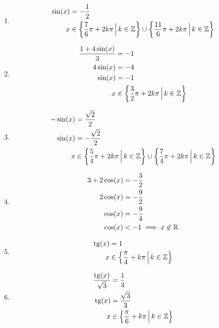 \documentclass[11pt,a4paper]{article}
\begin{document}
\begin{enumerate}
				\item 
				\begin{align*}
					\sin(x) &= - \frac 12
				\\
					x &\in \left\{ \frac 76 \pi + 2k\pi \, \Big| \, k \in {\mathbb Z} \right\} \cup \left\{ \frac{11}6 \pi + 2k\pi \, \Big| \, k \in {\mathbb Z} \right\}
				\end{align*}
				
				\item 
				\begin{align*}
					\frac{1 + 4\sin(x)}{3} &= -1
				\\
					4\sin(x) &= -4
				\\
					\sin(x) &= -1
				\\
					x &\in \left\{ \frac 32 \pi + 2k\pi \, \Big| \, k \in {\mathbb Z} \right\}
				\end{align*}
				
				\item 
				\begin{align*}
					-\sin(x) &= \frac{\sqrt 2}{2}
				\\
					\sin(x) &= -\frac{\sqrt 2}{2}
				\\
					x &\in \left\{ \frac 54 \pi + 2k\pi \, \Big| \, k \in {\mathbb Z} \right\} \cup \left\{ \frac 74 \pi + 2k\pi \, \Big| \, k \in {\mathbb Z} \right\}
				\end{align*}
				
				\item 
				\begin{align*}
					3 + 2\cos(x) &= -\frac 32
				\\
					2\cos(x) &= -\frac 92
				\\
					\cos(x) &= -\frac 94
				\\
					\cos(x) &< -1 \implies x \not\in {\mathbb R}
				\end{align*}
				
				\item 
				\begin{align*}
					\mathrm{tg}(x) &= 1
				\\
					x &\in \left\{ \frac \pi 4 + k\pi \, \Big| \, k \in {\mathbb Z} \right\}
				\end{align*}
				
				\item 
				\begin{align*}
					\frac{\mathrm{tg}(x)}{\sqrt 3} &= \frac 13
				\\
					\mathrm{tg}(x) &= \frac{\sqrt 3}{3}
				\\
					x &\in \left\{ \frac \pi 6 + k\pi \, \Big| \, k \in {\mathbb Z} \right\}
				\end{align*}
				

\end{enumerate}
\end{document}
